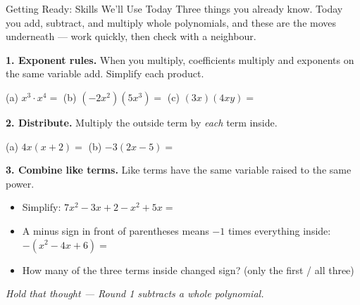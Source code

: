 \documentclass[12pt]{article}
\begin{document}

\vspace{0.10in}

\begin{notesbox}{Getting Ready: Skills We'll Use Today}
Three things you already know. Today you add, subtract, and multiply whole polynomials, and
these are the moves underneath --- work quickly, then check with a neighbour.

\vspace{8pt}
\textbf{1. Exponent rules.} When you multiply, coefficients multiply and exponents on the same
variable add. Simplify each product.
\begin{center}
(a)\; $x^3\cdot x^4=$ \blank{1.6cm} \qquad
(b)\; $(-2x^2)(5x^3)=$ \blank{1.9cm} \qquad
(c)\; $(3x)(4xy)=$ \blank{1.9cm}
\end{center}

\vspace{8pt}
\textbf{2. Distribute.} Multiply the outside term by \emph{each} term inside.
\begin{center}
(a)\; $4x(x+2)=$ \blank{2.8cm} \qquad\qquad
(b)\; $-3(2x-5)=$ \blank{2.8cm}
\end{center}

\vspace{8pt}
\textbf{3. Combine like terms.} Like terms have the same variable raised to the same power.
\begin{itemize}[leftmargin=1.6em, itemsep=8pt]
  \item Simplify: \; $7x^2-3x+2-x^2+5x=$ \blank{3.4cm}
  \item A minus sign in front of parentheses means $-1$ times everything inside: \\[2pt]
        $-(x^2-4x+6)=$ \blank{3.4cm}
  \item How many of the three terms inside changed sign? \blank{3.2cm}
        (only the first / all three)
\end{itemize}
\textit{Hold that thought --- Round 1 subtracts a whole polynomial.}
\end{notesbox}
\end{document}
